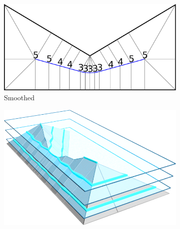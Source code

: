 \begin{figure}
\begin{subfigure}{\figwidth}
\includegraphics[width=\figwidthTwo]{sources/method/surface/smoothed.pdf}
\caption{Smoothed}\label{3d_surface_overview_smoothed}
\end{subfigure}
\begin{subfigure}{\figwidth}\centering
\hspace*{\tempheightTwo}
\includegraphics[width=\figwidthTree]{sources/method/surface/sliced_cropped.png}

\vspace{\tempheight}


\end{subfigure}
\end{figure}
